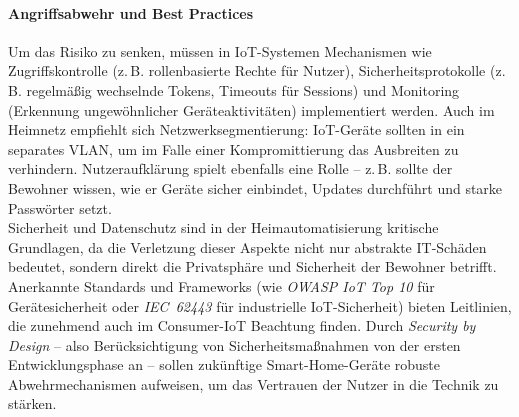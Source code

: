 \paragraph{Angriffsabwehr und Best Practices}
Um das Risiko zu senken, müssen in IoT-Systemen Mechanismen wie Zugriffskontrolle (z.\,B. rollenbasierte Rechte für Nutzer), Sicherheitsprotokolle (z.\,B. regelmäßig wechselnde Tokens, Timeouts für Sessions) und Monitoring (Erkennung ungewöhnlicher Geräteaktivitäten) implementiert werden. Auch im Heimnetz empfiehlt sich Netzwerksegmentierung: IoT-Geräte sollten in ein separates VLAN, um im Falle einer Kompromittierung das Ausbreiten zu verhindern. Nutzeraufklärung spielt ebenfalls eine Rolle – z.\,B. sollte der Bewohner wissen, wie er Geräte sicher einbindet, Updates durchführt und starke Passwörter setzt. 
\\
Sicherheit und Datenschutz sind in der Heimautomatisierung kritische Grundlagen, da die Verletzung dieser Aspekte nicht nur abstrakte IT-Schäden bedeutet, sondern direkt die Privatsphäre und Sicherheit der Bewohner betrifft. Anerkannte Standards und Frameworks (wie \emph{OWASP IoT Top 10} für Gerätesicherheit oder \emph{IEC~62443} für industrielle IoT-Sicherheit) bieten Leitlinien, die zunehmend auch im Consumer-IoT Beachtung finden. Durch \emph{Security by Design} – also Berücksichtigung von Sicherheitsmaßnahmen von der ersten Entwicklungsphase an – sollen zukünftige Smart-Home-Geräte robuste Abwehrmechanismen aufweisen, um das Vertrauen der Nutzer in die Technik zu stärken.
